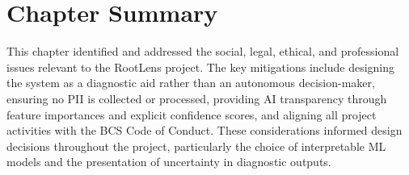 \section{Chapter Summary}
This chapter identified and addressed the social, legal, ethical, and professional issues relevant to the RootLens project. The key mitigations include designing the system as a diagnostic aid rather than an autonomous decision-maker, ensuring no PII is collected or processed, providing AI transparency through feature importances and explicit confidence scores, and aligning all project activities with the BCS Code of Conduct. These considerations informed design decisions throughout the project, particularly the choice of interpretable ML models and the presentation of uncertainty in diagnostic outputs.
